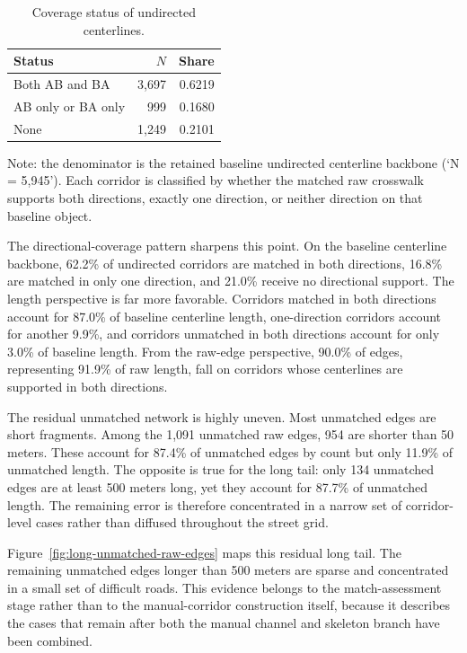 \documentclass[12pt]{article}
\begin{document}
	\begin{table}[h!]
		\centering
		\caption{Coverage status of undirected centerlines.}
		\label{tab:undirected-coverage}
		\begin{tabular}{l r r}
			\toprule
			Status & $N$ & Share \\
			\midrule
			Both AB and BA & 3,697 & 0.6219 \\
			AB only or BA only & 999 & 0.1680 \\
			None & 1,249 & 0.2101 \\
			\bottomrule
		\end{tabular}
		\vspace{0.3em}
		\begin{minipage}{\textwidth}
			\footnotesize
			\raggedright
			Note: the denominator is the retained baseline undirected centerline backbone (`N = 5,945'). Each corridor is classified by whether the matched raw crosswalk supports both directions, exactly one direction, or neither direction on that baseline object.
		\end{minipage}
	\end{table}
	
	The directional-coverage pattern sharpens this point. On the baseline centerline backbone, 62.2\% of undirected corridors are matched in both directions, 16.8\% are matched in only one direction, and 21.0\% receive no directional support. The length perspective is far more favorable. Corridors matched in both directions account for 87.0\% of baseline centerline length, one-direction corridors account for another 9.9\%, and corridors unmatched in both directions account for only 3.0\% of baseline length. From the raw-edge perspective, 90.0\% of edges, representing 91.9\% of raw length, fall on corridors whose centerlines are supported in both directions.
	
	The residual unmatched network is highly uneven. Most unmatched edges are short fragments. Among the 1,091 unmatched raw edges, 954 are shorter than 50 meters. These account for 87.4\% of unmatched edges by count but only 11.9\% of unmatched length. The opposite is true for the long tail: only 134 unmatched edges are at least 500 meters long, yet they account for 87.7\% of unmatched length. The remaining error is therefore concentrated in a narrow set of corridor-level cases rather than diffused throughout the street grid.
	
	Figure~\ref{fig:long-unmatched-raw-edges} maps this residual long tail. The remaining unmatched edges longer than 500 meters are sparse and concentrated in a small set of difficult roads. This evidence belongs to the match-assessment stage rather than to the manual-corridor construction itself, because it describes the cases that remain after both the manual channel and skeleton branch have been combined.
	
\end{document}
